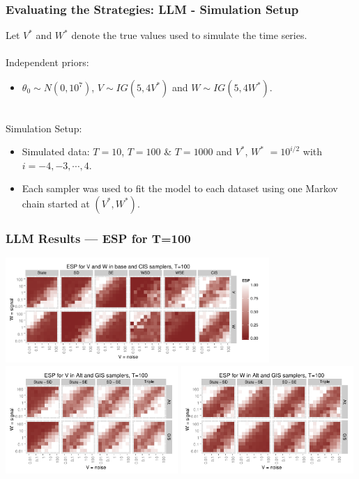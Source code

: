 \documentclass[xcolor=dvipsnames]{beamer}
\begin{document}
\begin{frame}
\frametitle{Evaluating the Strategies: LLM - Simulation Setup}

Let $V^*$ and $W^*$ denote the true values used to simulate the time series.\\~\\

Independent priors:
\begin{itemize}
\item $\theta_0\sim N(0, 10^7)$, $V\sim IG(5, 4V^*)$ and $W\sim IG(5, 4W^*)$.\\~\\
\end{itemize}

Simulation Setup:
\begin{itemize}
\item Simulated data: $T=10$, $T=100$ \& $T=1000$ and $V^*$, $W^*$ $=10^{i/2}$ with $i=-4,-3,\cdots,4$.
\item Each sampler was used to fit the model to each dataset using one Markov chain started at $(V^*,W^*)$.
\end{itemize}

\end{frame}

\begin{frame}
\frametitle{LLM Results --- ESP for T=100}
\centering
\includegraphics[width=0.75\textwidth]{basecisESplot100}\\
\includegraphics[width=0.49\textwidth]{altintESplotV100}
\includegraphics[width=0.49\textwidth]{altintESplotW100}
\end{frame}
\end{document}
